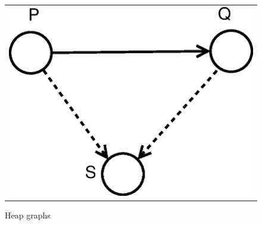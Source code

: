 \begin{itemize}
\begin{figure}[h]
\begin{center}
\begin{tabular}{c}
\includegraphics[scale=.4]{diagrams/Impl_2.eps} %
\end{tabular}
\caption{Heap graphs}  \label{fig:Eq5_example}
\end{center}
\end{figure}


\end{itemize}
